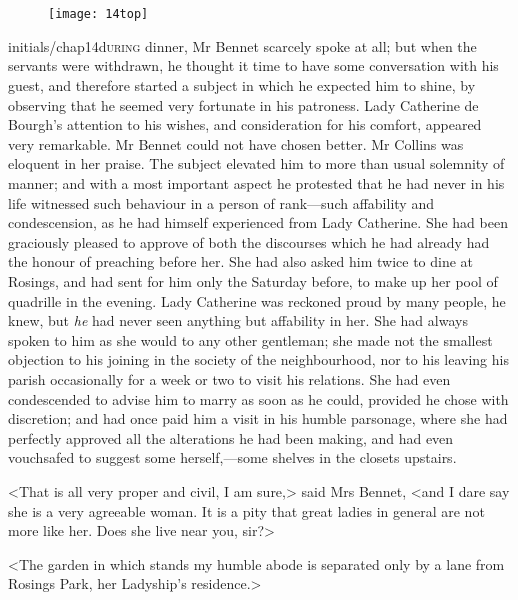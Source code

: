 \chapter[Chapter \thechapter]{}
\begin{figure}[t!]
\centering
\texttt{[image: 14top]}
\end{figure}

\lettrine[lines=5,image=true,lhang=.1]{initials/chap14d}{uring}  dinner, Mr Bennet scarcely spoke at all; but when the servants were withdrawn, he thought it time to have some conversation with his guest, and therefore started a subject in which he expected him to shine, by observing that he seemed very fortunate in his patroness. Lady Catherine de Bourgh's attention to his wishes, and consideration for his comfort, appeared very remarkable. Mr Bennet could not have chosen better. Mr Collins was eloquent in her praise. The subject elevated him to more than usual solemnity of manner; and with a most important aspect he protested that he had never in his life witnessed such behaviour in a person of rank—such affability and condescension, as he had himself experienced from Lady Catherine. She had been graciously pleased to approve of both the discourses which he had already had the honour of preaching before her. She had also asked him twice to dine at Rosings, and had sent for him only the Saturday before, to make up her pool of quadrille in the evening. Lady Catherine was reckoned proud by many people, he knew, but \textit{he} had never seen anything but affability in her. She had always spoken to him as she would to any other gentleman; she made not the smallest objection to his joining in the society of the neighbourhood, nor to his leaving his parish occasionally for a week or two to visit his relations. She had even condescended to advise him to marry as soon as he could, provided he chose with discretion; and had once paid him a visit in his humble parsonage, where she had perfectly approved all the alterations he had been making, and had even vouchsafed to suggest some herself,—some shelves in the closets upstairs.

<That is all very proper and civil, I am sure,> said Mrs Bennet, <and I dare say she is a very agreeable woman. It is a pity that great ladies in general are not more like her. Does she live near you, sir?>

<The garden in which stands my humble abode is separated only by a lane from Rosings Park, her Ladyship's residence.>

